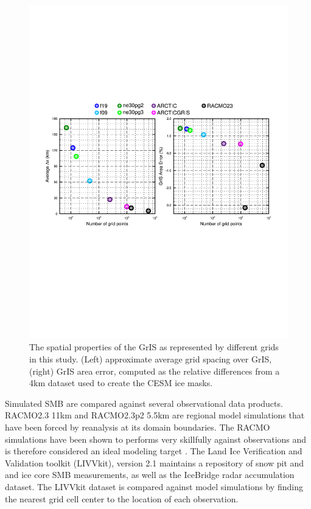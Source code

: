 \documentclass[draft]{agujournal2019}
\begin{document}
\begin{figure}[t]
\begin{center}
         \includegraphics[width=130mm]{figs/temp_grisres.pdf}
\end{center}
\caption{The spatial properties of the GrIS as represented by different grids in this study. (Left) approximate average grid spacing over GrIS, (right) GrIS area error, computed as the relative differences from a 4km dataset used to create the CESM ice masks.}
\label{fig:grisdx}
\end{figure}

Simulated SMB are compared against several observational data products. RACMO2.3 11km and RACMO2.3p2 5.5km are regional model simulations that have been forced by reanalysis at its domain boundaries. The RACMO simulations have been shown to performs very skillfully against observations and is therefore considered an ideal modeling target \cite{NETAL2015TC,NETAL2019SCIENCE}. The Land Ice Verification and Validation toolkit (LIVVkit), version 2.1 \cite{LIVVkit} maintains a repository of snow pit and and ice core SMB measurements, as well as the IceBridge radar accumulation dataset. The LIVVkit dataset is compared against model simulations by finding the nearest grid cell center to the location of each observation.
\end{document}
